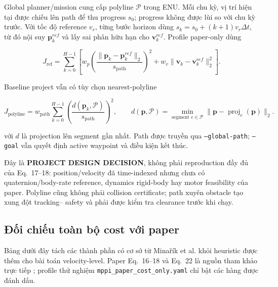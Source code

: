 \documentclass[11pt,a4paper]{article}
\newcommand{\code}[1]{\texttt{#1}}
\newcommand{\vect}[1]{\bm{#1}}
\begin{document}
Global planner/mission cung cấp polyline $\mathcal P$ trong ENU. Mỗi chu kỳ,
vị trí hiện tại được chiếu lên path để thu progress $s_0$; progress không được
lùi so với chu kỳ trước. Với tốc độ reference $v_r$, từng bước horizon dùng
$s_k=s_0+(k+1)v_r\Delta t$, từ đó nội suy $\vect p_k^{ref}$ và lấy sai phân hữu
hạn cho $\vect v_k^{ref}$. Profile paper-only dùng

\begin{equation}
  J_{\mathrm{ref}} = \sum_{k=0}^{H-1}\left[
  w_{p}
  \left(\frac{\|\vect p_k-\vect p_k^{ref}\|_2}{s_{\mathrm{path}}}\right)^2
  + w_v\|\vect v_k-\vect v_k^{ref}\|_2^2\right].
\end{equation}

Baseline project vẫn có tùy chọn nearest-polyline

\begin{equation}
  J_{\mathrm{polyline}} = w_{\mathrm{path}}
  \sum_{k=0}^{H-1}
  \left(\frac{d(\vect p_k,\mathcal P)}{s_{\mathrm{path}}}\right)^2,
  \qquad
  d(\vect p,\mathcal P)=\min_{\text{segment }e\in\mathcal P}
  \|\vect p-\operatorname{proj}_{e}(\vect p)\|_2 .
\end{equation}

với $d$ là projection lên segment gần nhất. Path được truyền qua
\code{--global-path}; \code{--goal} vẫn quyết định active waypoint và điều kiện
kết thúc.

Đây là \textbf{PROJECT DESIGN DECISION}, không phải reproduction đầy đủ của
Eq.~17--18: position/velocity đã time-indexed nhưng chưa có quaternion/body-rate
reference, dynamics rigid-body hay motor feasibility của paper. Polyline cũng
không phải collision certificate; path xuyên obstacle tạo xung đột tracking--
safety và phải được kiểm tra clearance trước khi chạy.

\subsection{Đối chiếu toàn bộ cost với paper}

Bảng dưới đây tách các thành phần có cơ sở từ Minařík et al. khỏi heuristic
được thêm cho bài toán velocity-level. Paper Eq.~16--18 và Eq.~22 là nguồn
tham khảo trực tiếp \cite{minarik2024agilemppi}; profile thử nghiệm
\code{mppi\_paper\_cost\_only.yaml} chỉ bật các hàng được đánh dấu.
\end{document}
